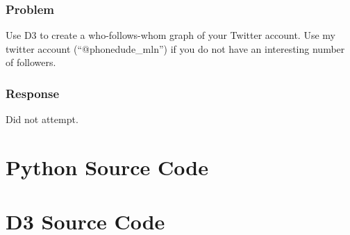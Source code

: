 \documentclass[letterpaper,11pt]{report}
\begin{document}
\begin{savenotes}
\subsection{Problem}Use D3 to create a who-follows-whom graph of your Twitter account.  Use my twitter account (``@phonedude\_mln'') if you do not have an interesting number of followers.
\subsection{Response}Did not attempt.


\end{savenotes}




\appendix
{}

\chapter{Python Source Code} \label{chap:Python}

\chapter{D3 Source Code} \label{chap:D3}

\end{document}
